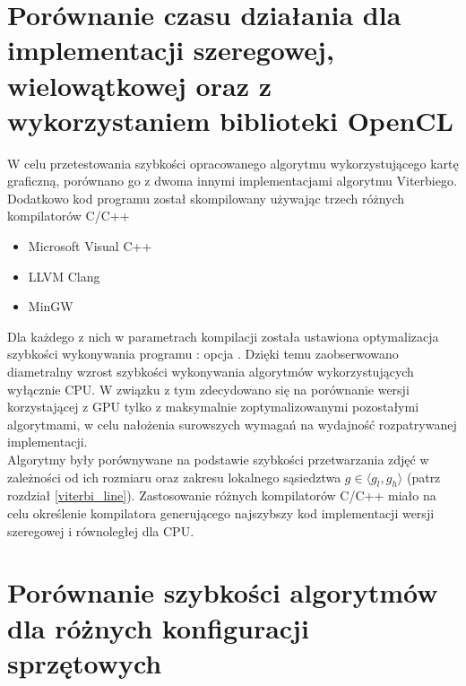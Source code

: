 \documentclass[document.tex]{subfiles}
\begin{document}
\section{Porównanie czasu działania dla implementacji szeregowej, wielowątkowej
oraz z wykorzystaniem biblioteki OpenCL}
\indent W celu przetestowania szybkości opracowanego algorytmu wykorzystującego
kartę graficzną, porównano go z dwoma innymi implementacjami algorytmu Viterbiego.
Dodatkowo kod programu został skompilowany używając trzech różnych kompilatorów C/C++
\begin{itemize}
    \item Microsoft Visual C++
    \item LLVM Clang
    \item MinGW
\end{itemize}
Dla każdego z nich w parametrach kompilacji została ustawiona optymalizacja szybkości
wykonywania programu : opcja . Dzięki temu zaobserwowano diametralny wzrost
szybkości wykonywania algorytmów wykorzystujących wyłącznie CPU. W związku z tym 
zdecydowano się na porównanie wersji korzystającej z GPU tylko z maksymalnie
zoptymalizowanymi pozostałymi algorytmami, w celu nałożenia surowszych wymagań
na wydajność rozpatrywanej implementacji.
\\
\indent Algorytmy były porównywane na podstawie szybkości przetwarzania zdjęć
w zależności od ich rozmiaru oraz zakresu lokalnego sąsiedztwa $g\in \langle g_l, g_h \rangle$
(patrz rozdział \ref{viterbi_line}). Zastosowanie różnych kompilatorów C/C++ miało
na celu określenie kompilatora generującego najszybszy kod implementacji wersji szeregowej
i równoległej dla CPU.



\section{Porównanie szybkości algorytmów dla różnych konfiguracji sprzętowych}
\end{document}
